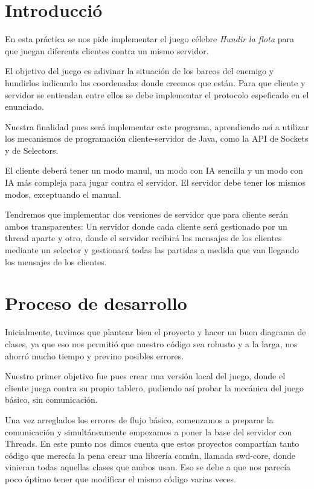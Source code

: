 \section*{Introducció}
En esta práctica se nos pide implementar el juego célebre \textit{Hundir la flota} para que juegan diferents clientes contra un mismo servidor.

El objetivo del juego es adivinar la situación de los barcos del enemigo y hundirlos indicando las coordenadas donde creemos que están. Para que cliente y servidor se entiendan entre ellos se debe implementar el protocolo espeficado en el enunciado.

Nuestra finalidad pues será implementar este programa, aprendiendo así a utilizar los mecanismos de programación cliente-servidor de Java, como la API de Sockets y de Selectors.

El cliente deberá tener un modo manul, un modo con IA sencilla y un modo con IA más compleja para jugar contra el servidor. El servidor debe tener los mismos modos, exceptuando el manual.

Tendremos que implementar dos versiones de servidor que para cliente serán ambos transparentes: Un servidor donde cada cliente será gestionado por un thread aparte y otro, donde el servidor recibirá los mensajes de los clientes mediante un selector y gestionará todas las partidas a medida que van llegando los mensajes de los clientes.

\newpage
\section*{Proceso de desarrollo}
Inicialmente, tuvimos que plantear bien el proyecto y hacer un buen diagrama de clases, ya que eso nos permitió que nuestro código sea robusto  y a la larga, nos ahorró mucho tiempo y previno posibles errores.

Nuestro primer objetivo fue pues crear una versión local del juego, donde el cliente juega contra su propio tablero, pudiendo así probar la mecánica del juego básico, sin comunicación.

Una vez arreglados los errores de flujo básico, comenzamos a preparar la comunicación y simultáneamente empezamos a poner la base del servidor con Threads. En este punto nos dimos cuenta que estos proyectos compartían tanto código que merecía la pena crear una librería común, llamada swd-core,  donde vinieran todas aquellas clases que ambos usan. Eso se debe a que nos parecía poco óptimo tener que modificar el mismo código varias veces.

